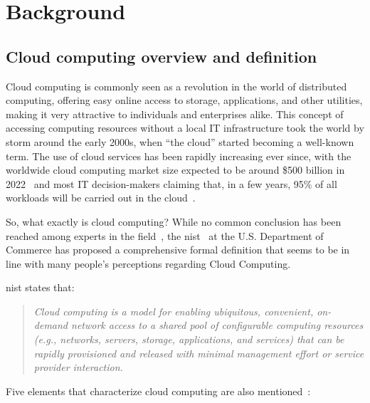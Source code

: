 \chapter{Background}\label{ch:background}


\section{Cloud computing overview and definition}

Cloud computing is commonly seen as a revolution in the world of distributed computing, offering easy online access to storage, applications, and other utilities, making it very attractive to individuals and enterprises alike. This concept of accessing computing resources without a local IT infrastructure took the world by storm around the early 2000s, when ``the cloud'' started becoming a well-known term. The use of cloud services has been rapidly increasing ever since, with the worldwide cloud computing market size expected to be around \$500 billion in 2022~\cite{gvr} and most IT decision-makers claiming that, in a few years, 95\% of all workloads will be carried out in the cloud~\cite{logicmonitor}.

So, what exactly is cloud computing? While no common conclusion has been reached among experts in the field~\cite{cmany}, the \ac{nist}~\cite{nist} at the U.S. Department of Commerce has proposed a comprehensive formal definition that seems to be in line with many people's perceptions regarding Cloud Computing.

\ac{nist} states that: \blockquote{\textit{Cloud computing is a model for enabling ubiquitous, convenient, on-demand network access to a shared pool of configurable computing resources (e.g., networks, servers, storage, applications, and services) that can be rapidly provisioned and released with minimal management effort or service provider interaction.}}

Five elements that characterize cloud computing are also mentioned~\cite{nist,c2,cmany}:


